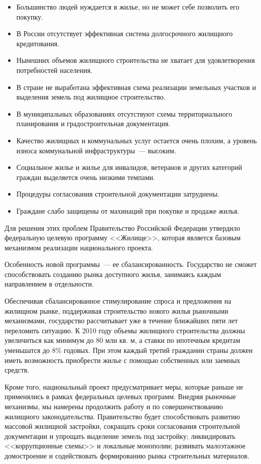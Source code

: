 \documentclass[article, 12pt, russian, oneside]{ncc}
\begin{document}
\begin{itemize}
\item Большинство людей нуждается в жилье, но не может себе позволить
  его покупку.
\item В России отсутствует эффективная система долгосрочного жилищного
  кредитования.
\item Нынешних объемов жилищного строительства не хватает для
  удовлетворения потребностей населения.
\item В стране не выработана эффективная схема реализации земельных
  участков и выделения земель под жилищное строительство.
\item В муниципальных образованиях отсутствуют схемы территориального
  планирования и градостроительная документация.
\item Качество жилищных и коммунальных услуг остается очень плохим, а
  уровень износа коммунальной инфраструктуры~--- высоким.
\item Социальное жилье и жилье для инвалидов, ветеранов и других
  категорий граждан выделяется очень низкими темпами.
\item Процедуры согласования строительной документации затруднены.
\item Граждане слабо защищены от махинаций при покупке и продаже
  жилья.
\end{itemize}

Для решения этих проблем Правительство Российской Федерации утвердило
федеральную целевую программу <<Жилище>>, которая является базовым
механизмом реализации национального проекта.

Особенность новой программы~--- ее сбалансированность. Государство не
сможет способствовать созданию рынка доступного жилья, занимаясь
каждым направлением в отдельности.

Обеспечивая сбалансированное стимулирование спроса и предложения на
жилищном рынке, поддерживая строительство нового жилья рыночными
механизмами, государство рассчитывает уже в течение ближайших пяти лет
переломить ситуацию. К 2010 году объемы жилищного строительства должны
увеличиться как минимум до 80 млн кв. м, а ставки по ипотечным
кредитам уменьшатся до 8\% годовых. При этом каждый третий гражданин
страны должен иметь возможность приобрести жилье с помощью собственных
или заемных средств.

Кроме того, национальный проект предусматривает меры, которые раньше
не применялись в рамках федеральных целевых программ. Внедряя рыночные
механизмы, мы намерены продолжить работу и по совершенствованию
жилищного законодательства. Правительство будет способствовать
развитию массовой жилищной застройки, сокращать сроки согласования
строительной документации и упрощать выделение земель под застройку;
ликвидировать <<коррупционные схемы>> и локальные монополии; развивать
малоэтажное домостроение и содействовать формированию рынка
строительных материалов.
\end{document}

